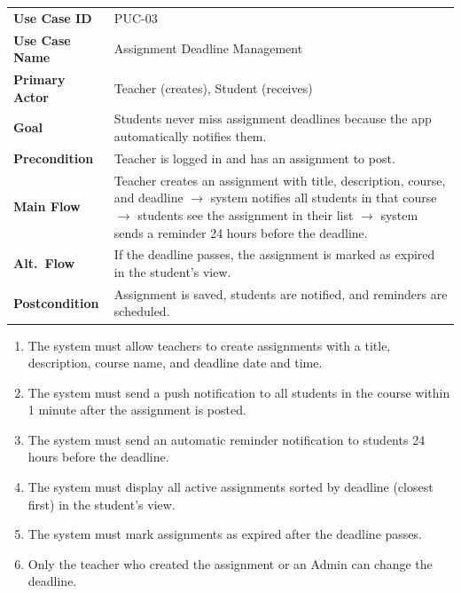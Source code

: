 \documentclass[12pt,a4paper]{article}
\begin{document}
\begin{tcolorbox}[pucbox, title={Product Use Case --- PUC-03}]
\begin{tabularx}{\linewidth}{p{3.5cm} X}
\textbf{Use Case ID}    & PUC-03 \\
\textbf{Use Case Name}  & Assignment Deadline Management \\
\textbf{Primary Actor}  & Teacher (creates), Student (receives) \\
\textbf{Goal}           & Students never miss assignment deadlines because the app automatically notifies them. \\
\textbf{Precondition}   & Teacher is logged in and has an assignment to post. \\
\textbf{Main Flow}      & Teacher creates an assignment with title, description, course, and deadline $\rightarrow$ system notifies all students in that course $\rightarrow$ students see the assignment in their list $\rightarrow$ system sends a reminder 24 hours before the deadline. \\
\textbf{Alt.\ Flow}     & If the deadline passes, the assignment is marked as expired in the student's view. \\
\textbf{Postcondition}  & Assignment is saved, students are notified, and reminders are scheduled. \\
\end{tabularx}
\end{tcolorbox}

\begin{tcolorbox}[frbox, title={Functional Requirements --- PUC-03}]
\begin{enumerate}[leftmargin=*, label=\textbf{FR-03.\arabic*}, itemsep=5pt]
  \item The system must allow teachers to create assignments with a title, description, course name, and deadline date and time.
  \item The system must send a push notification to all students in the course within 1 minute after the assignment is posted.
  \item The system must send an automatic reminder notification to students 24 hours before the deadline.
  \item The system must display all active assignments sorted by deadline (closest first) in the student's view.
  \item The system must mark assignments as expired after the deadline passes.
  \item Only the teacher who created the assignment or an Admin can change the deadline.
\end{enumerate}
\end{tcolorbox}
\end{document}
